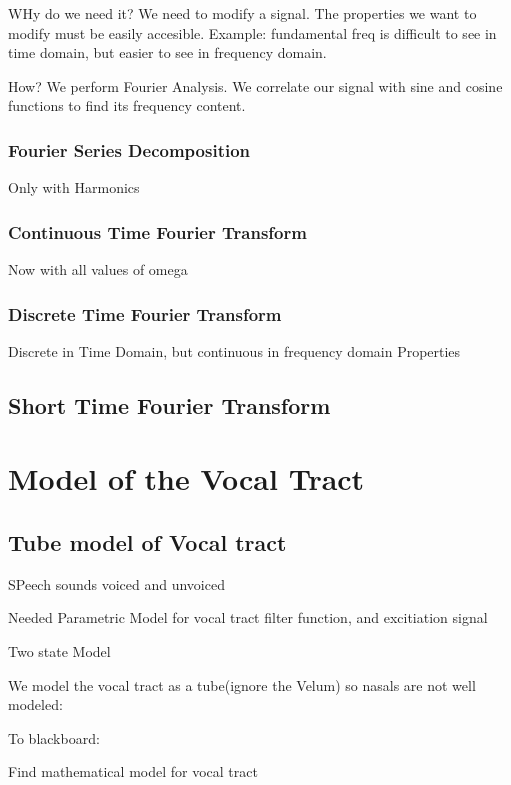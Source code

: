 \documentclass{article}
\begin{document}
WHy do we need it?  We need to modify a signal.  The properties we want to modify must be easily accesible. Example:  fundamental freq is difficult to see in time domain, but easier to see in frequency domain.

How?  We perform Fourier Analysis.  We correlate our signal with sine and cosine functions to find its frequency content.

\subsubsection{Fourier Series Decomposition}
Only with Harmonics

\subsubsection{Continuous Time Fourier Transform}
Now with all values of omega

\subsubsection{Discrete Time Fourier Transform}
Discrete in Time Domain, but continuous in frequency domain
Properties


\subsection{Short Time Fourier Transform}







\section{Model of the Vocal Tract}


\subsection{Tube model of Vocal tract}

SPeech sounds voiced and unvoiced

Needed Parametric Model for vocal tract filter function, and excitiation signal

Two state Model

We model the vocal tract as a  tube(ignore the Velum) so nasals are not well modeled:

To blackboard:

Find mathematical model for vocal tract
\end{document}

